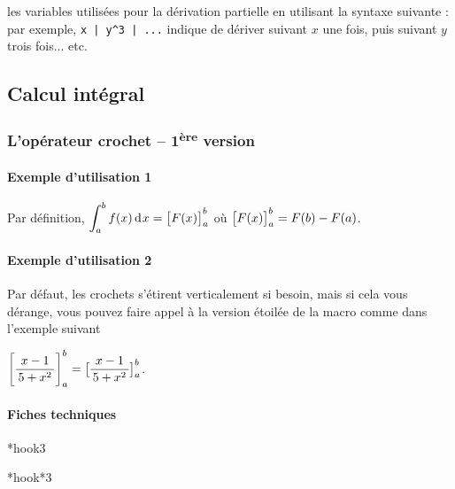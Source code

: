 \documentclass[12pt,a4paper]{article}
\makeatletter
\theoremstyle{definition}
\newcommand\IDmacro{\@ifstar{\@IDmacro@star}{\@IDmacro@no@star}}
\newcommand\@IDmacro@no@star[3]{%
    \texttt{%
    	\textbackslash#1%
    	\IfStrEq{#2}{0}{}{%
    		\,\,[#2 Option%
				\IfStrEq{#2}{1}{}{s}]%
			}%
	    \IfStrEq{#3}{}{}{%
	    		\,\,(#3 Argument%
				\IfStrEq{#3}{1}{}{s})%
			}
	   	}
    \immediate\write\tempfile{macro,#1,#2,#3}%
}
\newcommand\@IDmacro@star[2]{%
    \@IDmacro@no@star{#1}{0}{#2}%
}
\newcommand\@IDoptarg{\@ifstar{\@IDoptarg@star}{\@IDoptarg@no@star}}
\newcommand\@IDoptarg@star[2]{%
	\vspace{0.5em}
	\textbf{---} \texttt{#1%
		\IfStrEq{#2}{}{:}{\,#2:}%
	}%
}
\newcommand\@IDoptarg@no@star[2]{%
	\IfStrEq{#2}{}{%
		\@IDoptarg@star{#1}{}%
	}{%
		\@IDoptarg@star{#1}{#2}%
	}%
}
\newcommand\IDarg[1]{%
	\@IDoptarg{Argument}{#1}%
}
\makeatother
\begin{document}
\IDarg{2} les variables utilisées pour la dérivation partielle en utilisant la syntaxe suivante : par exemple, \verb+x | y^3 | ...+ indique de dériver suivant $x$ une fois, puis suivant $y$ trois fois... etc.





    \subsection{Calcul intégral}

        \subsubsection{L'opérateur crochet -- 1\textsuperscript{ère} version}

            \paragraph{Exemple d'utilisation 1}

\begin{tcblisting}{}
Par définition, $\displaystyle \int_{a}^{b} f(x) \dd{x} = \hook{F(x)}{a}{b}$ où
$\hook{F(x)}{a}{b} = F(b) - F(a)$.
\end{tcblisting}


            \paragraph{Exemple d'utilisation 2}

Par défaut, les crochets s'étirent verticalement si besoin, mais si cela vous dérange, vous pouvez faire appel à la version étoilée de la macro comme dans l'exemple suivant

\begin{tcblisting}{}
$\displaystyle \hook{\frac{x - 1}{5 + x^2}}{a}{b}
             = \hook*{\frac{x - 1}{5 + x^2}}{a}{b}$.
\end{tcblisting}


            \paragraph{Fiches techniques}

\IDmacro*{hook}{3}

\IDmacro*{hook*}{3}
\end{document}
